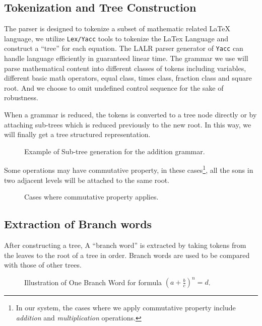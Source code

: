 \documentclass{acm_proc_article-sp}
\begin{document}
\subsection{Tokenization and Tree Construction}
The parser is designed to tokenize a subset of mathematic related \LaTeX{} language, we utilize \texttt{Lex/Yacc} tools to tokenize the LaTex Language and construct a ``tree'' for each equation. The LALR parser generator of \texttt{Yacc} can handle language efficiently in guaranteed linear time\cite{Knuth}. The grammar we use will parse mathematical content into different classes of tokens including variables, different basic math operators, equal class, times class, fraction class and square root. And we choose to omit undefined control sequence for the sake of robustness. 

When a grammar is reduced, the tokens is converted to a tree node directly or by attaching sub-trees which is reduced previously to the new root. In this way, we will finally get a tree structured representation.

\begin{figure}
\caption{Example of Sub-tree generation for the addition grammar.}
\end{figure}

Some operations may have commutative property, in these cases\footnote{In our system, the cases where we apply commutative property include \textit{addition} and \textit{multiplication} operations.}, all the sons in two adjacent levels will be attached to the same root.

\begin{figure}
\caption{Cases where commutative property applies.}
\end{figure}

\subsection{Extraction of Branch words}
After constructing a tree, A ``branch word'' is extracted by taking tokens from the leaves to the root of a tree in order. Branch words are used to be compared with those of other trees. 

\begin{figure}
\centering
{}
\caption{Illustration of One Branch Word for formula $(a+\frac{b}{c})^n = d$.}
\end{figure}
\end{document}
